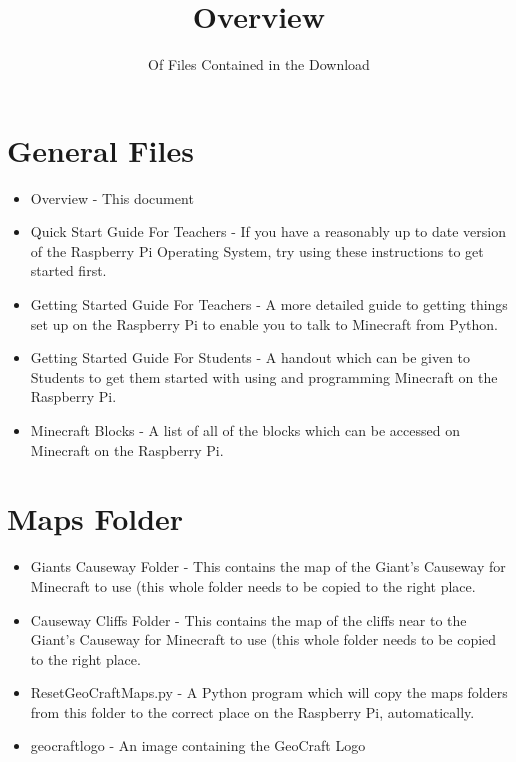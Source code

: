 \documentclass{geocraft-worksheet}
\begin{document}
\title{Overview}
\subtitle{Of Files Contained in the Download}

\date{}

\maketitle

\section*{General Files}
\begin{itemize}
\item Overview - This document
\item Quick Start Guide For Teachers - If you have a reasonably up to
  date version of the Raspberry Pi Operating System, try using these
  instructions to get started first.
\item Getting Started Guide For Teachers - A more detailed guide to
  getting things set up on the Raspberry Pi to enable you to talk to
  Minecraft from Python.
\item Getting Started Guide For Students - A handout which can be
  given to Students to get them started with using and programming
  Minecraft on the Raspberry Pi.
\item Minecraft Blocks - A list of all of the blocks which can be
  accessed on Minecraft on the Raspberry Pi.
\end{itemize}

\section*{Maps Folder}
\begin{itemize}
\item Giants Causeway Folder - This contains the map of the Giant's
  Causeway for Minecraft to use (this whole folder needs to be copied
  to the right place.
\item Causeway Cliffs Folder - This contains the map of the cliffs
  near to the  Giant's Causeway for Minecraft to use (this whole
  folder needs to be copied to the right place.
\item ResetGeoCraftMaps.py - A Python program which will copy the maps
  folders from this folder to the correct place on the Raspberry Pi,
  automatically. 
\item geocraftlogo - An image containing the GeoCraft Logo
\end{itemize}
\end{document}
